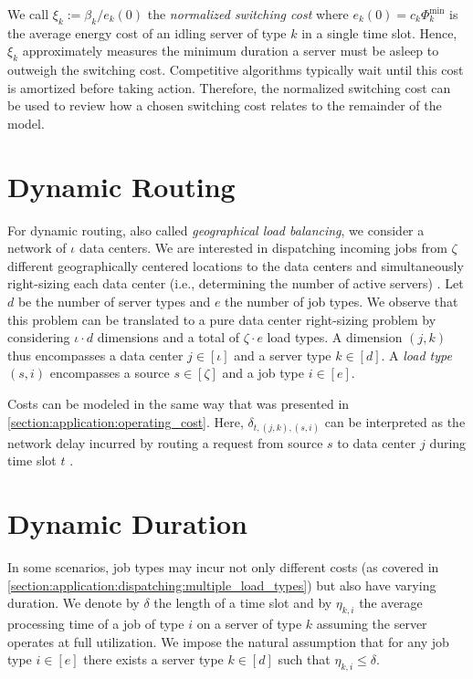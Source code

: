 We call $\xi_k := \beta_k / e_k(0)$ the \emph{normalized switching cost} where $e_k(0) = c_k \Phi_k^{\text{min}}$ is the average energy cost of an idling server of type $k$ in a single time slot. Hence, $\xi_k$ approximately measures the minimum duration a server must be asleep to outweigh the switching cost. Competitive algorithms typically wait until this cost is amortized before taking action. Therefore, the normalized switching cost can be used to review how a chosen switching cost relates to the remainder of the model.

\section{Dynamic Routing}\label{section:application:dynamic_routing}

For dynamic routing, also called \emph{geographical load balancing}, we consider a network of $\iota$ data centers. We are interested in dispatching incoming jobs from $\zeta$ different geographically centered locations to the data centers and simultaneously right-sizing each data center (i.e., determining the number of active servers) \cite{Lin2012}. Let $d$ be the number of server types and $e$ the number of job types. We observe that this problem can be translated to a pure data center right-sizing problem by considering $\iota \cdot d$ dimensions and a total of $\zeta \cdot e$ load types. A dimension $(j,k)$ thus encompasses a data center $j \in [\iota]$ and a server type $k \in [d]$. A \emph{load type} $(s,i)$ encompasses a source $s \in [\zeta]$ and a job type $i \in [e]$.

Costs can be modeled in the same way that was presented in \autoref{section:application:operating_cost}. Here, $\delta_{t,(j,k),(s,i)}$ can be interpreted as the network delay incurred by routing a request from source $s$ to data center $j$ during time slot $t$ \cite{Lin2012}.

\section{Dynamic Duration}\label{section:application:dynamic_duration}

In some scenarios, job types may incur not only different costs (as covered in \autoref{section:application:dispatching:multiple_load_types}) but also have varying duration. We denote by $\delta$ the length of a time slot and by $\eta_{k,i}$ the average processing time of a job of type $i$ on a server of type $k$ assuming the server operates at full utilization. We impose the natural assumption that for any job type $i \in [e]$ there exists a server type $k \in [d]$ such that $\eta_{k,i} \leq \delta$.

